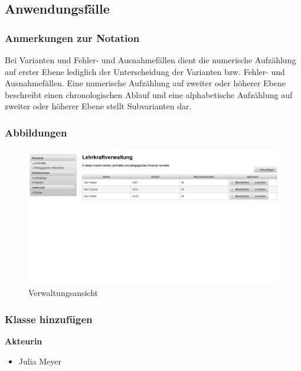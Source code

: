 \documentclass[fontsize=12pt,paper=a4,twoside]{scrartcl}
\begin{document}
\subsection{Anwendungsfälle}

\subsubsection{Anmerkungen zur Notation}
Bei Varianten und Fehler- und Ausnahmefällen dient die numerische Aufzählung auf erster Ebene lediglich der Unterscheidung der Varianten bzw. Fehler- und Ausnahmefällen. Eine numerische Aufzählung auf zweiter oder höherer Ebene beschreibt einen chronologischen Ablauf und eine alphabetische Aufzählung auf zweiter oder höherer Ebene stellt Subvarianten dar.
  
\subsubsection{Abbildungen}

\begin{figure}[H]
\caption{Verwaltungsansicht}
\includegraphics[width=\textwidth]{verwaltungsansicht.png}
\end{figure}
\vspace{5pt}



\subsubsection{Klasse hinzufügen}
\label{subsubsec:KlasseHinzufuegen}
\textbf{Akteurin}
\begin{itemize}
\item Julia Meyer
\end{itemize}
\vspace{5pt}
\end{document}

